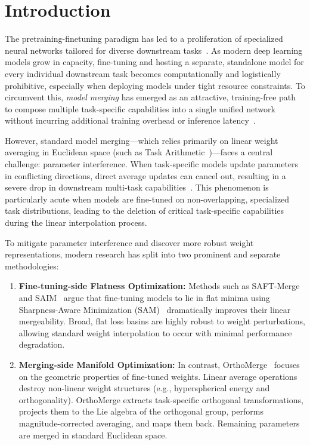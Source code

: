 \documentclass{article}
\begin{document}
\section{Introduction}
\label{sec:intro}

The pretraining-finetuning paradigm has led to a proliferation of specialized neural networks tailored for diverse downstream tasks~\cite{wortsman2022model,he2016deep,deng2009imagenet}. 
As modern deep learning models grow in capacity, fine-tuning and hosting a separate, standalone model for every individual downstream task becomes computationally and logistically prohibitive, especially when deploying models under tight resource constraints. 
To circumvent this, \emph{model merging} has emerged as an attractive, training-free path to compose multiple task-specific capabilities into a single unified network without incurring additional training overhead or inference latency~\cite{ilharco2022editing,jin2022dataless,matena2022merging}.

However, standard model merging—which relies primarily on linear weight averaging in Euclidean space (such as Task Arithmetic~\cite{ilharco2022editing})—faces a central challenge: parameter interference. 
When task-specific models update parameters in conflicting directions, direct average updates can cancel out, resulting in a severe drop in downstream multi-task capabilities~\cite{yadav2023ties}. This phenomenon is particularly acute when models are fine-tuned on non-overlapping, specialized task distributions, leading to the deletion of critical task-specific capabilities during the linear interpolation process.

To mitigate parameter interference and discover more robust weight representations, modern research has split into two prominent and separate methodologies:
\begin{enumerate}
    \item \textbf{Fine-tuning-side Flatness Optimization:} Methods such as SAFT-Merge~\cite{lee2025mitigating} and SAIM~\cite{anonymous2026saim} argue that fine-tuning models to lie in flat minima using Sharpness-Aware Minimization (SAM)~\cite{foret2021sharpness} dramatically improves their linear mergeability. Broad, flat loss basins are highly robust to weight perturbations, allowing standard weight interpolation to occur with minimal performance degradation.
    \item \textbf{Merging-side Manifold Optimization:} In contrast, OrthoMerge~\cite{yang2026orthomerge} focuses on the geometric properties of fine-tuned weights. Linear average operations destroy non-linear weight structures (e.g., hyperspherical energy and orthogonality). OrthoMerge extracts task-specific orthogonal transformations, projects them to the Lie algebra of the orthogonal group, performs magnitude-corrected averaging, and maps them back. Remaining parameters are merged in standard Euclidean space.
\end{enumerate}
\end{document}
